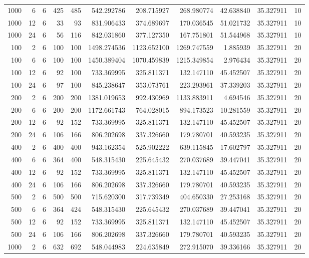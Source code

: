 \begin{table}
\begin{tabular}{rrrrrrrrrrr}
1000 & 6 & 6 & 425 & 485 & 542.292786 & 208.715927 & 268.980774 & 42.638840 & 35.327911 & 10 \\
1000 & 12 & 6 & 33 & 93 & 831.906433 & 374.689697 & 170.036545 & 51.021732 & 35.327911 & 10 \\
1000 & 24 & 6 & 56 & 116 & 842.031860 & 377.127350 & 167.751801 & 51.544968 & 35.327911 & 10 \\
100 & 2 & 6 & 100 & 100 & 1498.274536 & 1123.652100 & 1269.747559 & 1.885939 & 35.327911 & 20 \\
100 & 6 & 6 & 100 & 100 & 1450.389404 & 1070.459839 & 1215.349854 & 2.976434 & 35.327911 & 20 \\
100 & 12 & 6 & 92 & 100 & 733.369995 & 325.811371 & 132.147110 & 45.452507 & 35.327911 & 20 \\
100 & 24 & 6 & 97 & 100 & 845.238647 & 353.073761 & 223.293961 & 37.339203 & 35.327911 & 20 \\
200 & 2 & 6 & 200 & 200 & 1381.019653 & 992.430969 & 1133.883911 & 4.694546 & 35.327911 & 20 \\
200 & 6 & 6 & 200 & 200 & 1172.661743 & 764.028015 & 894.173523 & 10.281559 & 35.327911 & 20 \\
200 & 12 & 6 & 92 & 152 & 733.369995 & 325.811371 & 132.147110 & 45.452507 & 35.327911 & 20 \\
200 & 24 & 6 & 106 & 166 & 806.202698 & 337.326660 & 179.780701 & 40.593235 & 35.327911 & 20 \\
400 & 2 & 6 & 400 & 400 & 943.162354 & 525.902222 & 639.115845 & 17.602797 & 35.327911 & 20 \\
400 & 6 & 6 & 364 & 400 & 548.315430 & 225.645432 & 270.037689 & 39.447041 & 35.327911 & 20 \\
400 & 12 & 6 & 92 & 152 & 733.369995 & 325.811371 & 132.147110 & 45.452507 & 35.327911 & 20 \\
400 & 24 & 6 & 106 & 166 & 806.202698 & 337.326660 & 179.780701 & 40.593235 & 35.327911 & 20 \\
500 & 2 & 6 & 500 & 500 & 715.620300 & 317.739349 & 404.650330 & 27.253168 & 35.327911 & 20 \\
500 & 6 & 6 & 364 & 424 & 548.315430 & 225.645432 & 270.037689 & 39.447041 & 35.327911 & 20 \\
500 & 12 & 6 & 92 & 152 & 733.369995 & 325.811371 & 132.147110 & 45.452507 & 35.327911 & 20 \\
500 & 24 & 6 & 106 & 166 & 806.202698 & 337.326660 & 179.780701 & 40.593235 & 35.327911 & 20 \\
1000 & 2 & 6 & 632 & 692 & 548.044983 & 224.635849 & 272.915070 & 39.336166 & 35.327911 & 20 \\

\end{tabular}
\end{table}
